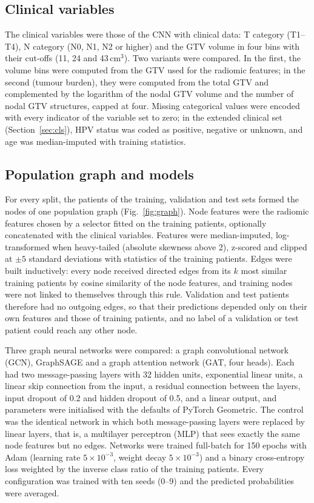 \documentclass[11pt,a4paper]{article}
\begin{document}
\subsection{Clinical variables}
The clinical variables were those of the CNN with clinical data\cite{mateus2023}: T category (T1--T4), N category (N0, N1, N2 or higher) and the GTV volume in four bins with their cut-offs (11, 24 and 43\,cm$^3$). Two variants were compared. In the first, the volume bins were computed from the GTV used for the radiomic features; in the second (tumour burden), they were computed from the total GTV and complemented by the logarithm of the nodal GTV volume and the number of nodal GTV structures, capped at four. Missing categorical values were encoded with every indicator of the variable set to zero; in the extended clinical set (Section~\ref{sec:cls}), HPV status was coded as positive, negative or unknown, and age was median-imputed with training statistics.

\subsection{Population graph and models}
For every split, the patients of the training, validation and test sets formed the nodes of one population graph (Fig.~\ref{fig:graph}). Node features were the radiomic features chosen by a selector fitted on the training patients, optionally concatenated with the clinical variables. Features were median-imputed, log-transformed when heavy-tailed (absolute skewness above 2), z-scored and clipped at $\pm5$ standard deviations with statistics of the training patients. Edges were built inductively: every node received directed edges from its $k$ most similar training patients by cosine similarity of the node features, and training nodes were not linked to themselves through this rule. Validation and test patients therefore had no outgoing edges, so that their predictions depended only on their own features and those of training patients, and no label of a validation or test patient could reach any other node.

Three graph neural networks were compared: a graph convolutional network (GCN)\cite{kipf2017gcn}, GraphSAGE\cite{hamilton2017graphsage} and a graph attention network (GAT, four heads)\cite{velickovic2018gat}. Each had two message-passing layers with 32 hidden units, exponential linear units, a linear skip connection from the input, a residual connection between the layers, input dropout of 0.2 and hidden dropout of 0.5, and a linear output, and parameters were initialised with the defaults of PyTorch Geometric. The control was the identical network in which both message-passing layers were replaced by linear layers, that is, a multilayer perceptron (MLP) that sees exactly the same node features but no edges. Networks were trained full-batch for 150 epochs with Adam (learning rate $5\times10^{-3}$, weight decay $5\times10^{-3}$) and a binary cross-entropy loss weighted by the inverse class ratio of the training patients. Every configuration was trained with ten seeds (0--9) and the predicted probabilities were averaged.
\end{document}
